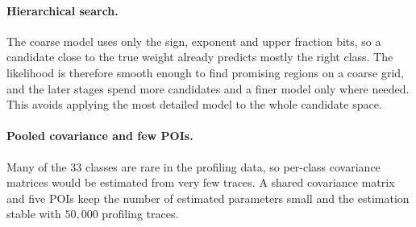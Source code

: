 \paragraph{Hierarchical search.}
The coarse model uses only the sign, exponent and upper fraction bits,
so a candidate close to the true weight already predicts mostly the
right class. The likelihood is therefore smooth enough to find promising
regions on a coarse grid, and the later stages spend more candidates and
a finer model only where needed. This avoids applying the most detailed
model to the whole candidate space.

\paragraph{Pooled covariance and few POIs.}
Many of the $33$ classes are rare in the profiling data, so per-class
covariance matrices would be estimated from very few traces. A shared
covariance matrix and five POIs keep the number of estimated parameters
small and the estimation stable with $50{,}000$ profiling traces.
